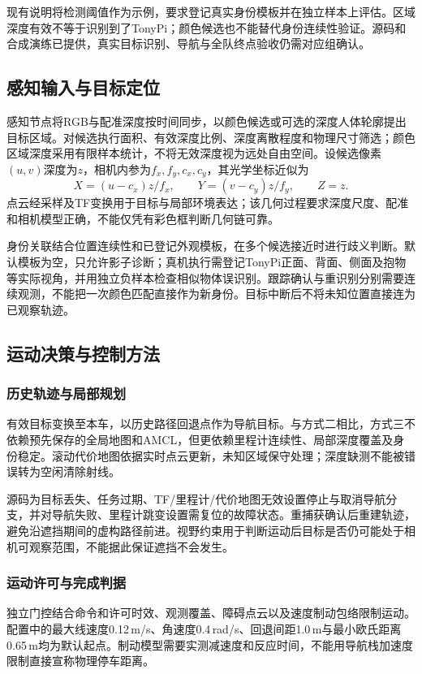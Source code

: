 现有说明将检测阈值作为示例，要求登记真实身份模板并在独立样本上评估。区域深度有效不等于识别到了TonyPi；颜色候选也不能替代身份连续性验证。源码和合成演练已提供，真实目标识别、导航与全队终点验收仍需对应组确认。

\subsection{感知输入与目标定位}
感知节点将RGB与配准深度按时间同步，以颜色候选或可选的深度人体轮廓提出目标区域。对候选执行面积、有效深度比例、深度离散程度和物理尺寸筛选；颜色区域深度采用有限样本统计，不将无效深度视为远处自由空间。设候选像素$(u,v)$深度为$z$，相机内参为$f_x,f_y,c_x,c_y$，其光学坐标近似为
\begin{equation}
X=(u-c_x)z/f_x,\qquad Y=(v-c_y)z/f_y,\qquad Z=z.
\end{equation}
点云经采样及TF变换用于目标与局部环境表达；该几何过程要求深度尺度、配准和相机模型正确，不能仅凭有彩色框判断几何链可靠。

身份关联结合位置连续性和已登记外观模板，在多个候选接近时进行歧义判断。默认模板为空，只允许影子诊断；真机执行需登记TonyPi正面、背面、侧面及抱物等实际视角，并用独立负样本检查相似物体误识别。跟踪确认与重识别分别需要连续观测，不能把一次颜色匹配直接作为新身份。目标中断后不将未知位置直接连为已观察轨迹。

\subsection{运动决策与控制方法}
\subsubsection{历史轨迹与局部规划}
有效目标变换至本车，以历史路径回退点作为导航目标。与方式二相比，方式三不依赖预先保存的全局地图和AMCL，但更依赖里程计连续性、局部深度覆盖及身份稳定。滚动代价地图依据实时点云更新，未知区域保守处理；深度缺测不能被错误转为空闲清除射线。

源码为目标丢失、任务过期、TF/里程计/代价地图无效设置停止与取消导航分支，并对导航失败、里程计跳变设置需复位的故障状态。重捕获确认后重建轨迹，避免沿遮挡期间的虚构路径前进。视野约束用于判断运动后目标是否仍可能处于相机可观察范围，不能据此保证遮挡不会发生。
\subsubsection{运动许可与完成判据}
独立门控结合命令和许可时效、观测覆盖、障碍点云以及速度制动包络限制运动。配置中的最大线速度0.12\,m/s、角速度0.4\,rad/s、回退间距1.0\,m与最小欧氏距离0.65\,m均为默认起点。制动模型需要实测减速度和反应时间，不能用导航栈加速度限制直接宣称物理停车距离。

